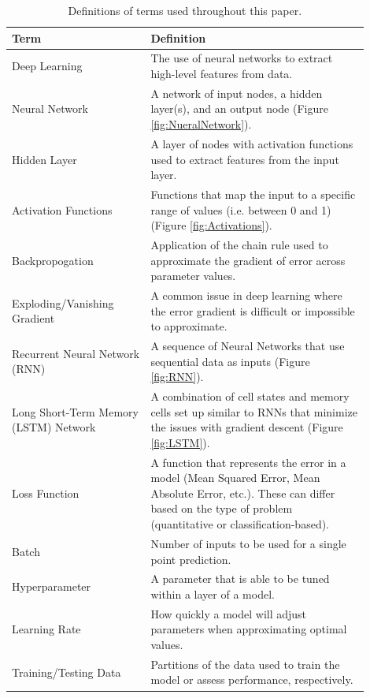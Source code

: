 \begin{table}[hbt!]
\centering
\begin{tabular}{|p{0.35\linewidth} | p{0.55\linewidth}|}
    \hline
    Term & Definition \\
    \hline
    Deep Learning & The use of neural networks to extract high-level features from data.\\
    \hline
    Neural Network & A network of input nodes, a hidden layer(s), and an output node (Figure \ref{fig:NueralNetwork}).\\
    \hline
    Hidden Layer & A layer of nodes with activation functions used to extract features from the input layer. \\
    \hline
    Activation Functions & Functions that map the input to a specific range of values (i.e. between 0 and 1) (Figure \ref{fig:Activations}).\\
    \hline
    Backpropogation & Application of the chain rule used to approximate the gradient of error across parameter values. \\
    \hline 
    Exploding/Vanishing Gradient & A common issue in deep learning where the error gradient is difficult or impossible to approximate. \\
    \hline
    Recurrent Neural Network (RNN) & A sequence of Neural Networks that use sequential data as inputs (Figure \ref{fig:RNN}).\\
    \hline
    Long Short-Term Memory (LSTM) Network & A combination of cell states and memory cells set up similar to RNNs that minimize the issues with gradient descent (Figure \ref{fig:LSTM}). \\
    \hline
    Loss Function & A function that represents the error in a model (Mean Squared Error, Mean Absolute Error, etc.). These can differ based on the type of problem (quantitative or classification-based).\\
    \hline
    Batch & Number of inputs to be used for a single point prediction. \\
    \hline
    Hyperparameter & A parameter that is able to be tuned within a layer of a model. \\
    \hline
    Learning Rate & How quickly a model will adjust parameters when approximating optimal values. \\
    \hline
    Training/Testing Data & Partitions of the data used to train the model or assess performance, respectively. \\
    \hline
    
    \hline
\end{tabular}
\caption{Definitions of terms used throughout this paper.}
\label{tab:Definitions}
\end{table}

